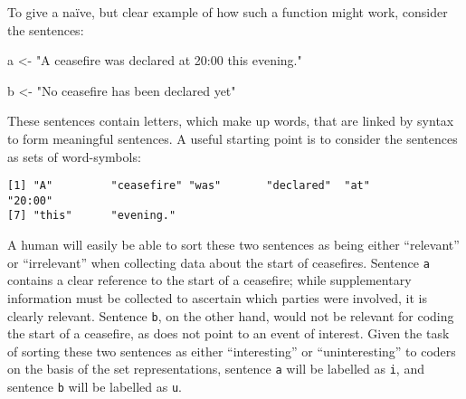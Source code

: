 \documentclass[12pt,twoside]{reedthesis}
\newenvironment{Shaded}{\begin{snugshade}}{\end{snugshade}}
\newcommand{\StringTok}[1]{\textcolor[rgb]{0.31,0.60,0.02}{#1}}
\newcommand{\NormalTok}[1]{#1}
\begin{document}
To give a naïve, but clear example of how such a function might work,
consider the sentences:
\begin{Shaded}
\begin{Highlighting}[]
\NormalTok{a <-}\StringTok{ "A ceasefire was declared at 20:00 this evening."}

\NormalTok{b <-}\StringTok{ "No ceasefire has been declared yet"} 
\end{Highlighting}
\end{Shaded}
These sentences contain letters, which make up words, that are linked by
syntax to form meaningful sentences. A useful starting point is to
consider the sentences as sets of word-symbols:
\begin{verbatim}
[1] "A"         "ceasefire" "was"       "declared"  "at"        "20:00"    
[7] "this"      "evening." 
\end{verbatim}
A human will easily be able to sort these two sentences as being either
``relevant'' or ``irrelevant'' when collecting data about the start of
ceasefires. Sentence \texttt{a} contains a clear reference to the start
of a ceasefire; while supplementary information must be collected to
ascertain which parties were involved, it is clearly relevant. Sentence
\texttt{b}, on the other hand, would not be relevant for coding the
start of a ceasefire, as does not point to an event of interest. Given
the task of sorting these two sentences as either ``interesting'' or
``uninteresting'' to coders on the basis of the set representations,
sentence \texttt{a} will be labelled as \texttt{i}, and sentence
\texttt{b} will be labelled as \texttt{u}.
\end{document}
